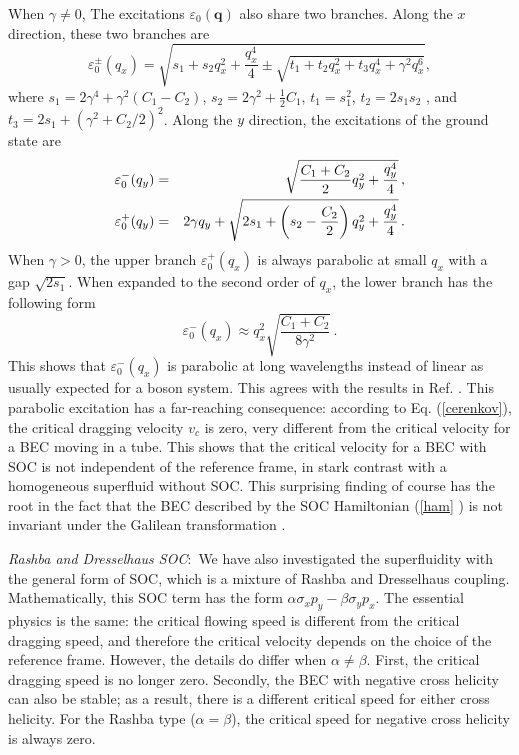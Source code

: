 \documentclass[doublecol]{epl2}
\begin{document}
When $\gamma\neq 0$, The excitations $\varepsilon_0({\mathbf{q}})$ also
share two branches. Along the $x$ direction, these two branches are
\begin{equation}
\varepsilon _{0}^{\pm }(q_{x})=\sqrt{s_{1}+s_{2}q_{x}^{2}+\frac{q_{x}^{4}}{4}%
\pm \sqrt{t_{1}+t_{2}q_{x}^{2}+t_{3}q_{x}^{4}+\gamma ^{2}q_{x}^{6}}},
\end{equation}%
where $s_{1}=2\gamma ^{4}+\gamma ^{2}\left( C_{1}-C_{2}\right) $, $%
s_{2}=2\gamma ^{2}+\frac{1}{2}C_{1}$, $t_{1}=s_{1}^{2}$, $t_{2}=2s_{1}s_{2}$%
, and $t_{3}=2s_{1}+\left( \gamma ^{2}+C_{2}/2\right) ^{2}$.
Along the $y$ direction, the excitations of the ground state are
\begin{eqnarray}
\varepsilon _0^{-}(q_{y}) &=&\sqrt{\frac{C_{1}+C_{2}}{2}q_{y}^{2}+\frac{q_{y}^{4}%
}{4}}\,, \\
\varepsilon _0^{+}(q_{y}) &=&2\gamma q_{y}+\sqrt{2s_{1}+\left( s_{2}-\frac{C_{2}}{%
2}\right) q_{y}^{2}+\frac{q_{y}^{4}}{4}}\,.
\end{eqnarray}%
When $\gamma >0$, the upper branch $\varepsilon _{0}^{+}(q_{x})$ is always parabolic at
small $q_{x} $ with a gap $\sqrt{2s_{1}}$. When expanded to the second order
of $q_{x}$, the lower branch has the following form
\begin{equation}
\varepsilon _{0}^{-}(q_{x})\approx q_{x}^{2}\sqrt{\frac{C_{1}+C_{2}}{8\gamma
^{2}}}\,.  \label{para}
\end{equation}%
This shows that $\varepsilon _{0}^{-}(q_{x})$ is parabolic at long
wavelengths instead of linear as usually expected for a boson system. This
agrees with the results in Ref. \cite{zhai2}. This parabolic excitation has
a far-reaching consequence: according to Eq. (\ref{cerenkov}), the critical
dragging velocity $v_c$ is zero, very different from the critical velocity
for a BEC moving in a tube. This shows that the critical velocity for a BEC
with SOC is not independent of the reference frame, in stark contrast with a
homogeneous superfluid without SOC. This surprising finding of course has
the root in the fact that the BEC described by the SOC Hamiltonian (\ref{ham}%
) is not invariant under the Galilean transformation \cite{messiah}.

\textit{Rashba and Dresselhaus SOC}:~We have also investigated the superfluidity with the
general form of SOC, which is a mixture of Rashba and Dresselhaus coupling.
Mathematically, this SOC term has the form $\alpha\sigma_{x}p_{y}-\beta
\sigma_{y}p_{x}$. The essential physics is the same: the critical flowing
speed is different from the critical dragging speed, and therefore the
critical velocity depends on the choice of the reference frame. However, the
details do differ when $\alpha \neq \beta $. First, the critical dragging
speed is no longer zero. Secondly, the BEC with negative cross helicity can
also be stable; as a result, there is a different critical speed for either
cross helicity. For the Rashba type ($\alpha=\beta $), the critical speed
for negative cross helicity is always zero.
\end{document}
